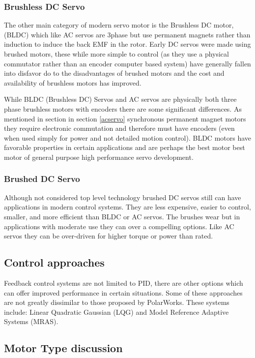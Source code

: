 \documentclass{article}
\begin{document}
\subsubsection{Brushless DC Servo}
The other main category of modern servo motor is the Brushless DC motor, (BLDC) which like AC servos are 3phase but use permanent magnets rather than induction to induce the back EMF in the rotor. Early DC servos were made using brushed motors, these while more simple to control (as they use a physical commutator rather than an encoder computer based system) have generally fallen into disfavor do to the disadvantages of brushed motors and the cost and availability of brushless motors has improved. 
\par
While BLDC (Brushless DC) Servos and AC servos are physically both three phase brushless motors with encoders there are some significant differences. As mentioned in section in section \ref{acservo} synchronous permanent magnet motors they require electronic commutation and therefore must have encoders (even when used simply for power and not detailed motion control). BLDC motors have favorable properties in certain applications and are perhaps the best motor best motor of general purpose high performance servo development. 
\subsubsection{Brushed DC Servo}
Although not considered top level technology brushed DC servos still can have applications in modern control systems. They are less expensive, easier to control, smaller, and more efficient than BLDC or AC servos. The brushes wear but in applications with moderate use they can over a compelling options. Like AC servos they can be over-driven for higher torque or power than rated. 

\subsection{Control approaches}  
Feedback control systems are not limited to PID, there are other options which can offer improved performance in certain situations. Some of these approaches are not greatly dissimilar to those proposed by PolarWorks. These systems include: Linear Quadratic Gaussian (LQG) and Model Reference Adaptive Systems (MRAS).
\subsection{Motor Type discussion}
\end{document}
